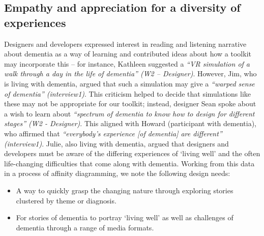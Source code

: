 \subsection{Empathy and appreciation for a diversity of experiences}
Designers and developers expressed interest in reading and listening narrative about dementia as a way of learning and contributed ideas about how a toolkit may incorporate this – for instance, Kathleen suggested a \textit{“VR simulation of a walk through a day in the life of dementia” (W2 – Designer)}. However, Jim, who is living with dementia, argued that such a simulation may give a \textit{“warped sense of dementia” (interview1)}. This criticism helped to decide that simulations like these may not be appropriate for our toolkit; instead, designer Sean spoke about a wish to learn about \textit{“spectrum of dementia to know how to design for different stages” (W2 - Designer)}. This aligned with Howard (participant with dementia), who affirmed that \textit{“everybody’s experience [of dementia] are different” (interview1)}. Julie, also living with dementia, argued that designers and developers must be aware of the differing experiences of ‘living well’ and the often life-changing difficulties that come along with dementia. Working from this data in a process of affinity diagramming, we note the following design needs:
\begin{itemize}
    \item A way to quickly grasp the changing nature through exploring stories clustered by theme or diagnosis.
    \item For stories of dementia to portray ‘living well’ as well as challenges of dementia through a range of media formats.
\end{itemize}

